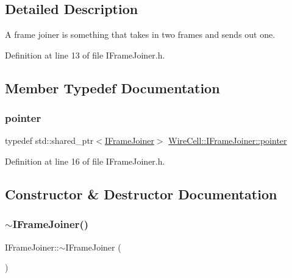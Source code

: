 \subsection{Detailed Description}
A frame joiner is something that takes in two frames and sends out one. 

Definition at line 13 of file I\+Frame\+Joiner.\+h.



\subsection{Member Typedef Documentation}
\mbox{\label{class_wire_cell_1_1_i_frame_joiner_a2a16f627f08fd104f0c58e6f174944e1}} 
\subsubsection{\texorpdfstring{pointer}{pointer}}
{\footnotesize\ttfamily typedef std\+::shared\+\_\+ptr$<$\hyperlink{class_wire_cell_1_1_i_frame_joiner}{I\+Frame\+Joiner}$>$ \hyperlink{class_wire_cell_1_1_i_frame_joiner_a2a16f627f08fd104f0c58e6f174944e1}{Wire\+Cell\+::\+I\+Frame\+Joiner\+::pointer}}



Definition at line 16 of file I\+Frame\+Joiner.\+h.



\subsection{Constructor \& Destructor Documentation}
\mbox{\label{class_wire_cell_1_1_i_frame_joiner_a4f0e53fda2faab6d19a90fa580230820}} 
\subsubsection{\texorpdfstring{$\sim$\+I\+Frame\+Joiner()}{~IFrameJoiner()}}
{\footnotesize\ttfamily I\+Frame\+Joiner\+::$\sim$\+I\+Frame\+Joiner (\begin{DoxyParamCaption}{ }\end{DoxyParamCaption})\hspace{0.3cm}{\ttfamily [virtual]}}



